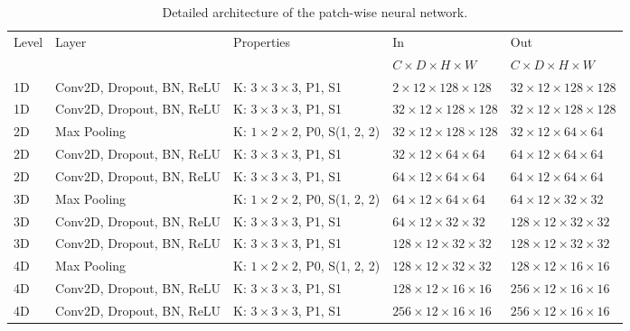 \begin{sidewaystable}[htbp]
   \centering
   \caption[Architecture of Patch]{Detailed architecture of the patch-wise neural network.}
   \begin{tabular}{l*{4}{l}}
      \toprule
      Level	& Layer						& Properties 					& In							& Out									\\
      		&							&								& $C \times D \times H \times W$& $C \times D \times H \times W$		\\
      \midrule
      1D	& Conv2D, Dropout, BN, ReLU & K: $3 \times 3 \times 3$, P1, S1			& $2 \times 12 \times 128 \times 128$	&	$32 \times 12 \times 128 \times 128$	\\
      1D	& Conv2D, Dropout, BN, ReLU & K: $3 \times 3 \times 3$, P1, S1			& $32 \times 12 \times 128 \times 128$	&	$32 \times 12 \times 128 \times 128$	\\
      2D	& Max Pooling				& K: $1 \times 2 \times 2$, P0, S(1, 2, 2)	& $32 \times 12 \times 128 \times 128$	&	$32 \times 12 \times 64 \times 64$	\\
      2D	& Conv2D, Dropout, BN, ReLU & K: $3 \times 3 \times 3$, P1, S1			& $32 \times 12 \times 64 \times 64$	&	$64 \times 12 \times 64 \times 64$	\\
      2D	& Conv2D, Dropout, BN, ReLU & K: $3 \times 3 \times 3$, P1, S1			& $64 \times 12 \times 64 \times 64$	& 	$64 \times 12 \times 64 \times 64$	\\
      3D	& Max Pooling				& K: $1 \times 2 \times 2$, P0, S(1, 2, 2)	& $64 \times 12 \times 64 \times 64$	& 	$64 \times 12 \times 32 \times 32$		\\
      3D	& Conv2D, Dropout, BN, ReLU & K: $3 \times 3 \times 3$, P1, S1			& $64 \times 12 \times 32 \times 32$	&	$128 \times 12 \times 32 \times 32$	\\
      3D	& Conv2D, Dropout, BN, ReLU & K: $3 \times 3 \times 3$, P1, S1			& $128 \times 12 \times 32 \times 32$	&	$128 \times 12 \times 32 \times 32$	\\
      4D	& Max Pooling				& K: $1 \times 2 \times 2$, P0, S(1, 2, 2)	& $128 \times 12 \times 32 \times 32$	&	$128 \times 12 \times 16 \times 16$	\\
      4D	& Conv2D, Dropout, BN, ReLU & K: $3 \times 3 \times 3$, P1, S1			& $128 \times 12 \times 16 \times 16$	&	$256 \times 12 \times 16 \times 16$	\\
      4D	& Conv2D, Dropout, BN, ReLU & K: $3 \times 3 \times 3$, P1, S1			& $256 \times 12 \times 16 \times 16$	&	$256 \times 12 \times 16 \times 16$	\\
      

\end{tabular}
\end{sidewaystable}
